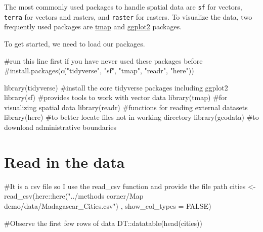 \documentclass[
  letterpaper,
  DIV=11,
  numbers=noendperiod]{scrreprt}
\newenvironment{Shaded}{\begin{snugshade}}{\end{snugshade}}
\newcommand{\AttributeTok}[1]{\textcolor[rgb]{0.40,0.45,0.13}{#1}}
\newcommand{\CommentTok}[1]{\textcolor[rgb]{0.37,0.37,0.37}{#1}}
\newcommand{\ConstantTok}[1]{\textcolor[rgb]{0.56,0.35,0.01}{#1}}
\newcommand{\FunctionTok}[1]{\textcolor[rgb]{0.28,0.35,0.67}{#1}}
\newcommand{\NormalTok}[1]{\textcolor[rgb]{0.00,0.23,0.31}{#1}}
\newcommand{\OtherTok}[1]{\textcolor[rgb]{0.00,0.23,0.31}{#1}}
\newcommand{\SpecialCharTok}[1]{\textcolor[rgb]{0.37,0.37,0.37}{#1}}
\newcommand{\StringTok}[1]{\textcolor[rgb]{0.13,0.47,0.30}{#1}}
\begin{document}
The most commonly used packages to handle spatial data are \texttt{sf}
for vectors, \texttt{terra} for vectors and rasters, and \texttt{raster}
for rasters. To visualize the data, two frequently used packages are
\href{https://r-tmap.github.io/tmap/}{tmap} and
\href{https://ggplot2.tidyverse.org/}{ggplot2} packages.

To get started, we need to load our packages.

\begin{Shaded}
\begin{Highlighting}[]
\CommentTok{\#run this line first if you have never used these packages before}
\CommentTok{\#install.packages(c("tidyverse", "sf", "tmap", "readr", "here"))}

\FunctionTok{library}\NormalTok{(tidyverse) }\CommentTok{\#install the core tidyverse packages including ggplot2}
\FunctionTok{library}\NormalTok{(sf) }\CommentTok{\#provides tools to work with vector data }
\FunctionTok{library}\NormalTok{(tmap) }\CommentTok{\#for visualizing spatial data}
\FunctionTok{library}\NormalTok{(readr) }\CommentTok{\#functions for reading external datasets }
\FunctionTok{library}\NormalTok{(here) }\CommentTok{\#to better locate files not in working directory}
\FunctionTok{library}\NormalTok{(geodata) }\CommentTok{\#to download administrative boundaries}
\end{Highlighting}
\end{Shaded}

\section{Read in the data}\label{read-in-the-data}

\begin{Shaded}
\begin{Highlighting}[]
\CommentTok{\#It is a csv file so I use the read\_csv function and provide the file path}
\NormalTok{cities }\OtherTok{\textless{}{-}} \FunctionTok{read\_csv}\NormalTok{(here}\SpecialCharTok{::}\FunctionTok{here}\NormalTok{(}\StringTok{"../methods corner/Map demo/data/Madagascar\_Cities.csv"}\NormalTok{)}
\NormalTok{                   , }\AttributeTok{show\_col\_types =} \ConstantTok{FALSE}\NormalTok{)}

\CommentTok{\#Observe the first few rows of data}
\NormalTok{DT}\SpecialCharTok{::}\FunctionTok{datatable}\NormalTok{(}\FunctionTok{head}\NormalTok{(cities))}
\end{Highlighting}
\end{Shaded}
\end{document}
